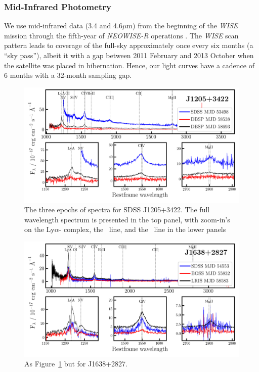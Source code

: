 \documentclass[fleqn,usenatbib]{mnras}
\begin{document}
\subsubsection{Mid-Infrared Photometry}
We use mid-infrared data (3.4 and 4.6$\mu$m) from the beginning
of the {\it WISE} mission \citep[2010 January; ][]{Wright2010} through
the fifth-year of {\it NEOWISE-R} operations \citep[2018 December;
][]{Mainzer2011}. The {\it WISE} scan pattern leads to coverage of the
full-sky approximately once every six months (a ``sky pass''), albeit
it with a gap between 2011 February and 2013 October when the
satellite was placed in hibernation. Hence, our light curves have a
cadence of 6 months with a 32-month sampling gap.

\begin{figure}
  \centering
  \includegraphics[width=16.7cm, trim=0.3cm 0.05cm 0.30cm 0.1cm, clip]
  {figures/J1205+3422_landscape_spectra.png}
  \vspace{-12pt}
  \caption[]{The three epochs of spectra for SDSS  J1205+3422.
    The full wavelength spectrum is presented in the top panel, 
    with zoom-in's on the Ly$\alpha$-\nv 
    complex, the \civ\ line, and the \mgii\ line in the lower panels}
  \label{fig:civ_clqs_J12_spec}
\end{figure}

\begin{figure}
  \centering
  \includegraphics[width=16.7cm, trim=0.3cm 0.05cm 0.30cm 0.1cm, clip]
  {figures/J1638+2827_landscape_spectra.png}
  \vspace{-12pt}
  \caption[]{As Figure~\ref{fig:civ_clqs_J12_spec} but for  J1638+2827.}
  \label{fig:civ_clqs_J16_spec}
\end{figure}
\end{document}
